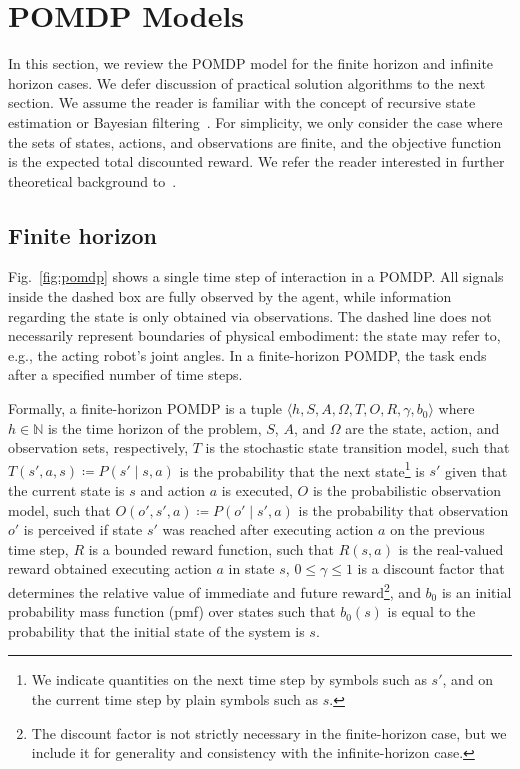 \documentclass[journal]{IEEEtran}
\begin{document}
\section{POMDP Models}
\label{sec:pomdps}
In this section, we review the POMDP model for the finite horizon and infinite horizon cases.
{We defer discussion of practical solution algorithms to the next section.}
We assume the reader is familiar with the concept of recursive state estimation or Bayesian filtering{~\cite{chen2003bayesian}}.
For simplicity, we only consider the case where the sets of states, actions, and observations are finite, and the objective function is the expected {total discounted reward}.
We refer the reader interested in further theoretical background to~\cite{puterman1994markov,kaelbling1998planning,hauskrecht2000value}.

\subsection{Finite horizon}
\label{subsec:finitehorizon}
Fig.~\ref{fig:pomdp} shows a single time step of interaction in a POMDP.
All signals inside the dashed box are fully observed by the agent, while information regarding the state is only obtained via observations.
The dashed line does not necessarily represent boundaries of physical embodiment: the state may refer to, e.g., the acting robot's joint angles.
In a finite-horizon POMDP, the task ends after a specified number of time steps.

{Formally, }a finite-horizon POMDP is a tuple $\langle h, S, A, \Omega, T, O, R,
\gamma, b_0\rangle$ where $h\in\mathbb{N}$ is the time horizon of the
problem, $S$, $A$, and $\Omega$ are the state, action, and observation sets, respectively,
$T$ is the
stochastic state transition model, such that {$T(s', a, s) \coloneqq P(s' \mid s, a)$} is the probability that the next state\footnote{We indicate quantities on the next time step by symbols such as $s'$, and on the current time step by plain symbols such as $s$.} is $s'$ given that the current state is $s$ and action $a$ is executed,
$O$ is the
probabilistic observation model, such that {$O(o',s',a) \coloneqq P(o' \mid s', a)$} is the probability that observation $o'$ is perceived if state $s'$ was reached after executing action $a$ on the previous time step,
$R$ is a bounded reward function, such that $R(s,a)$ is the real-valued reward obtained executing action $a$ in state $s$, $0 \leq \gamma \leq 1$ is a discount factor that determines the relative value of immediate and future {reward}\footnote{The discount factor is not strictly necessary in the finite-horizon case, but we include it for generality and consistency with the infinite-horizon case.}, and $b_0$ is an initial {probability mass function (pmf) over states} such that $b_0(s)$ is equal to the probability that the initial state of the system is $s$.
\end{document}
